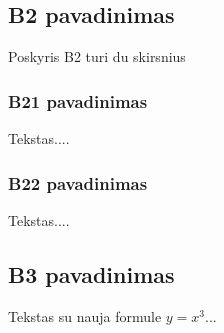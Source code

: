 \documentclass[a4paper,12pt]{article}
\begin{document}
   
 \subsection{B2 pavadinimas}
 Poskyris B2 turi du skirsnius
 \subsubsection{B21 pavadinimas}
  Tekstas....
  \subsubsection{B22 pavadinimas}
  Tekstas....
 \subsection{B3 pavadinimas}
 Tekstas su nauja formule $y=x^3$...
 
\end{document}
